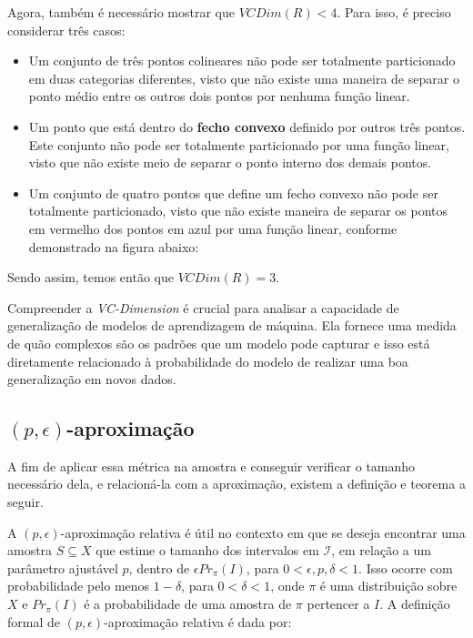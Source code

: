 Agora, também é necessário mostrar que $VCDim(R) < 4$. Para isso, é preciso
considerar três casos:
\begin{itemize}
    \item Um conjunto de três pontos colineares não pode ser totalmente particionado em duas categorias diferentes, visto que não existe uma maneira de separar o ponto médio entre os outros dois pontos por nenhuma função linear.

    \item Um ponto que está dentro do \textbf{fecho convexo} definido por outros três pontos. Este conjunto não pode ser totalmente particionado por uma função linear, visto que não existe meio de separar o ponto interno dos demais pontos.
\end{itemize}


\begin{itemize}
    \item Um conjunto de quatro pontos que define um fecho convexo não pode ser totalmente particionado, visto que não existe maneira de separar os pontos em vermelho dos pontos em azul por uma função linear, conforme demonstrado na figura abaixo:
\end{itemize}


Sendo assim, temos então que $VCDim(R) = 3$.

Compreender a \textit{VC-Dimension} é crucial para analisar a capacidade de generalização de modelos de aprendizagem de máquina. Ela fornece uma medida de quão complexos são os padrões que um modelo pode capturar e isso está diretamente relacionado à probabilidade do modelo de realizar uma boa generalização em novos dados.

\subsection{$(p, \epsilon)$-aproximação}\label{subsec:epi_aprox}

A fim de aplicar essa métrica na amostra e conseguir verificar o tamanho necessário dela, e relacioná-la com a aproximação, existem a definição e teorema a seguir.

A $(p, \epsilon)$-aproximação relativa é útil no contexto em que se deseja encontrar uma amostra $S \subseteq X$ que estime o tamanho dos intervalos em $\mathcal{I}$, em relação a um parâmetro ajustável $p$, dentro
de $\epsilon Pr_\pi(I)$, para $0 < \epsilon ,p, \delta < 1$. Isso ocorre com probabilidade pelo menos $1-\delta$, para $0 < \delta < 1$, onde $\pi$ é uma distribuição sobre $X$ e $Pr_\pi (I)$ é a probabilidade de uma amostra de $\pi$ pertencer a $I$. A definição formal de $(p,\epsilon)$-aproximação relativa é dada por:

